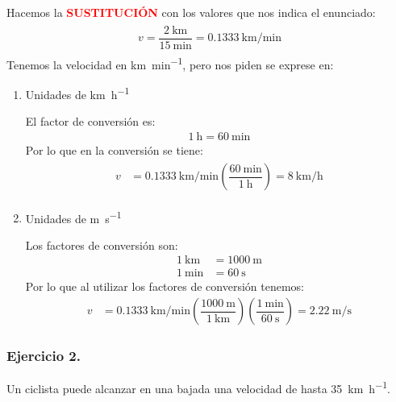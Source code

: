 \documentclass[14pt]{extarticle}
\newcommand{\textocolor}[2]{\textbf{\textcolor{#1}{#2}}}
\begin{document}
\begin{enumerate}
Hacemos la \textocolor{red}{SUSTITUCIÓN} con los valores que nos indica el enunciado:
\begin{eqnarray*}
\begin{aligned}
v = \dfrac{\SI{2}{\kilo\meter}}{\SI{15}{\minute}} =  \SI[per-mode=fraction]{0.1333}{\kilo\meter\per\minute}
\end{aligned}
\end{eqnarray*}
Tenemos la velocidad en \unit{\kilo\meter\per\minute}, pero nos piden se exprese en:
\begin{enumerate}[label=\alph*)]
\item Unidades de \unit{\kilo\meter\per\hour}

El factor de conversión es:
\begin{align*}
\SI{1}{\hour} = \SI{60}{\minute}
\end{align*}
Por lo que en la conversión se tiene:
\begin{eqnarray*}
\begin{aligned}
v &= \SI[per-mode=fraction]{0.1333}{\kilo\meter\per\minute} \left( \dfrac{\SI{60}{\minute}}{\SI{1}{\hour}} \right) =  \SI[per-mode=fraction]{8}{\kilo\meter\per\hour}
\end{aligned}
\end{eqnarray*}
\item Unidades de \unit{\meter\per\second}

Los factores de conversión son:
\begin{align*}
\SI{1}{\kilo\meter} &= \SI{1000}{\meter} \\[0.5em]
\SI{1}{\minute} &= \SI{60}{\second}
\end{align*}
Por lo que al utilizar los factores de conversión tenemos:
\begin{align*}
v &= \SI[per-mode=fraction]{0.1333}{\kilo\meter\per\minute} \left( \dfrac{\SI{1000}{\meter}}{\SI{1}{\kilo\meter}} \right) \left( \dfrac{\SI{1}{\minute}}{\SI{60}{\second}} \right)  =  \SI[per-mode=fraction]{2.22}{\meter\per\second}
\end{align*}
\end{enumerate}
\end{enumerate}

\subsubsection{Ejercicio 2.}

Un ciclista puede alcanzar en una bajada una velocidad de hasta \SI{35}{\kilo\meter\per\hour}.
\end{document}
